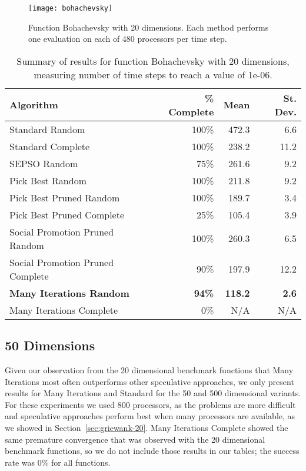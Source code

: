 \documentclass[smallcondensed]{svjour3}
\renewcommand{\sec}[1]{Section~\ref{sec:#1}}
\begin{document}
\begin{figure}
  \centering
  \texttt{[image: bohachevsky]}
  \caption{Function Bohachevsky with 20 dimensions.  Each method performs one
  evaluation on each of 480 processors per time step.}
  \label{fig:bohachevsky}
\end{figure}

\begin{table}
  \caption{Summary of results for function Bohachevsky with 20 dimensions,
  measuring number of time steps to reach a value of 1e-06.}
  \label{tab:bohachevsky-20}
  \centering
  \begin{tabular}{|l|r|r|r|}
  \hline
  Algorithm&\% Complete&Mean&St. Dev.\\
  \hline
  \hline
  Standard Random&100\%&472.3&6.6\\
  \hline
  Standard Complete&100\%&238.2&11.2\\
  \hline
  SEPSO Random&75\%&261.6&9.2\\
  \hline
  Pick Best Random&100\%&211.8&9.2\\
  \hline
  Pick Best Pruned Random&100\%&189.7&3.4\\
  \hline
  Pick Best Pruned Complete&25\%&105.4&3.9\\
  \hline
  Social Promotion Pruned Random&100\%&260.3&6.5\\
  \hline
  Social Promotion Pruned Complete&90\%&197.9&12.2\\
  \hline
  \textbf{Many Iterations Random}&\textbf{94\%}&\textbf{118.2}&\textbf{2.6}\\
  \hline
  Many Iterations Complete&0\%&N/A&N/A\\
  \hline
  \end{tabular}
\end{table}


\subsection{50 Dimensions}
\label{sec:50dims}

Given our observation from the 20 dimensional benchmark functions that Many
Iterations most often outperforms other speculative approaches, we only present
results for Many Iterations and Standard for the 50 and 500 dimensional
variants.  For these experiments we used 800 processors, as the problems are
more difficult and speculative approaches perform best when many processors are
available, as we showed in \sec{griewank-20}.  Many Iterations Complete showed
the same premature convergence that was observed with the 20 dimensional
benchmark functions, so we do not include those results in our tables; the
success rate was 0\% for all functions.
\end{document}
